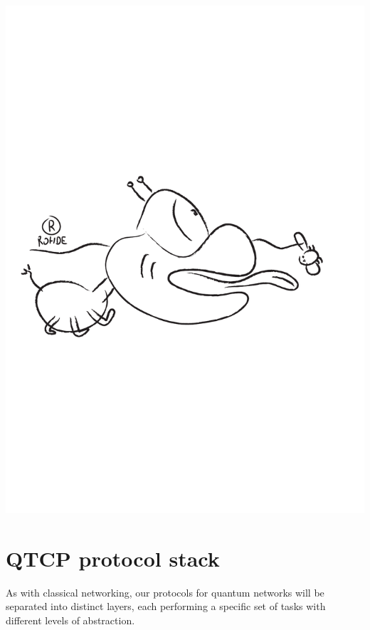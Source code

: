 \documentclass[aps, rmp, twocolumn, amsmath, amssymb, nofootinbib, superscriptaddress, longbibliography, floatfix, table-of-contents, eqsecnum]{revtex4-1}
\begin{document}
\begin{center}
	\includegraphics[width=0.6\columnwidth]{sketch_11}
\end{center}

%
%

\section{QTCP protocol stack} \label{sec:prot_stack} 

As with classical networking, our protocols for quantum networks will be separated into distinct layers, each performing a specific set of tasks with different levels of abstraction.
\end{document}
